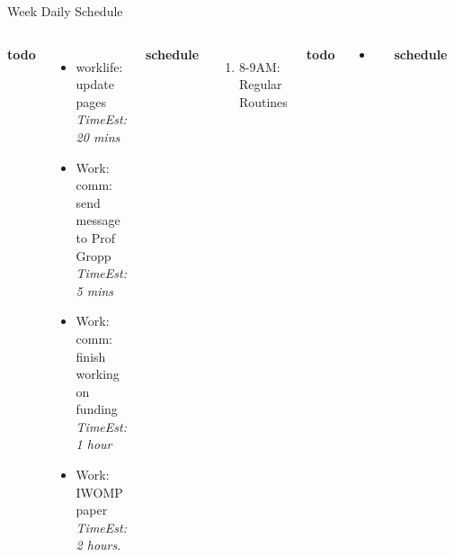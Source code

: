 \documentclass[serif, mathserif, final]{beamer}
\newcommand{\timeEst}[1]{\textit{Time:} \textit{#1}}
\newcommand{\te}[1]{\textit{TimeEst:} \textit{#1}}
\newcommand{\priority}[1]{\textit{Priority:} \textit{#1}}
\newcommand{\deadline}[1]{#1}
\begin{document}
\begin{frame}{}
\begin{columns}
\begin{column}{0.50\linewidth}
\begin{block}{Week Daily Schedule}
\begin{columns}
  \textbf{\small todo} \\
  \begin{itemize} 
  \tiny \item \tiny worklife: update pages \te{20 mins} 
    \item \tiny Work: comm: send message to Prof Gropp \te{5 mins} 
      \tiny \item \tiny Work: comm: finish working on funding \te{1 hour} 
    \item \tiny Work: IWOMP paper  \te {2 hours}. 
  \end{itemize}  
  \textbf{\small schedule}\\ 
  \begin{enumerate} 
    \tiny \item \tiny 8-9AM: Regular Routines 
  \end{enumerate} 

  \textbf{\small todo} \\
  \begin{itemize}
\tiny \item \tiny 

  \end{itemize}
  \textbf{\small schedule} \\
  \begin{enumerate}
    \tiny \item \tiny 8-9AM: Regular Routines 
  \end{enumerate}
  
  \textbf{\small todo}\\
  \begin{itemize} 
    \tiny \item \tiny Work: finish writing project. 
  \end{itemize}
  \textbf{\small schedule}\\
  \begin{enumerate} 
    \tiny \item \tiny 8-9AM: Regular Routines 
    \tiny \item 6:30PM - 7:15PM: TM 
    \tiny \item 7:15PM: Jump Labs 
  \end{enumerate} 
  
  \textbf{\small todo}\\ 
  \begin{itemize}
    \tiny \item \tiny -  \deadline{ }   \timeEst{}  \priority{} 
  \end{itemize}
  \textbf{\small schedule}\\
  \begin{enumerate}
    \tiny \item \tiny 8-9AM: Regular Routines 
  \end{enumerate}
  

\end{columns}
\end{block}
\end{column}
\end{columns}
\end{frame}
\end{document}
